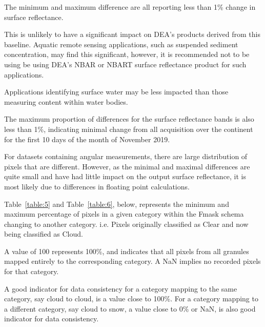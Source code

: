 \documentclass[a4paper]{article}
\begin{document}
      \begin{flushleft}
        The minimum and maximum difference are all reporting less than 1\% change in surface reflectance. \par
        This is unlikely to have a significant impact on DEA's products derived from this baseline. Aquatic remote sensing applications, such as suspended sediment concentration, may find this significant, however, it is recommended not to be using be using DEA's NBAR or NBART surface reflectance product for such applications. \par
        Applications identifying surface water may be less impacted than those measuring content within water bodies. \par
        The maximum proportion of differences for the surface reflectance bands is also less than 1\%, indicating minimal change from all acquisition over the continent for the first 10 days of the month of November 2019. \par
        For datasets containing angular measurements, there are large distribution of pixels that are different. However, as the minimal and maximal differences are quite small and have had little impact on the output surface reflectance, it is most likely due to differences in floating point calculations.
      \end{flushleft}

      \begin{flushleft}
        Table~\ref{table:5} and Table~\ref{table:6}, below, represents the minimum and maximum percentage of pixels in a given category within the Fmask schema changing to another category. i.e. Pixels originally classified as Clear and now being classified as Cloud. \par
        A value of 100 represents 100\%, and indicates that all pixels from all granules mapped entirely to the corresponding category. A NaN implies no recorded pixels for that category. \par
        A good indicator for data consistency for a category mapping to the same category, say cloud to cloud, is a value close to 100\%. For a category mapping to a different category, say cloud to snow, a value close to 0\% or NaN, is also good indicator for data consistency.
      \end{flushleft}

  \clearpage
\end{document}
